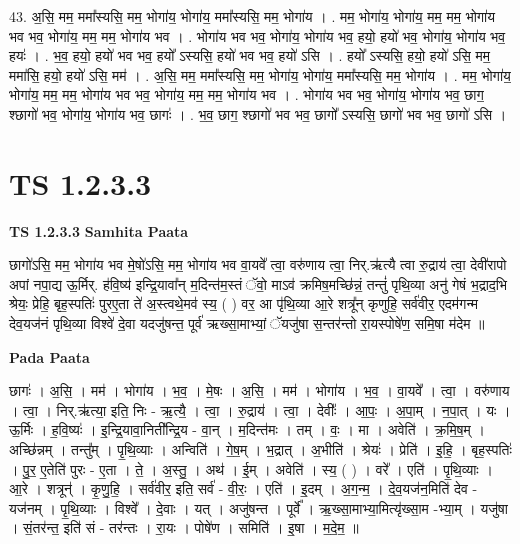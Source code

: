 \documentclass[17pt]{extarticle}
\begin{document}
43. अ॒सि॒ मम॒ ममा᳚स्यसि॒ मम॒ भोगा॑य॒ भोगा॑य॒ ममा᳚स्यसि॒ मम॒ भोगा॑य । . मम॒ भोगा॑य॒ भोगा॑य॒ मम॒ मम॒ भोगा॑य भव भव॒ भोगा॑य॒ मम॒ मम॒ भोगा॑य भव । . भोगा॑य भव भव॒ भोगा॑य॒ भोगा॑य भव॒ हयो॒ हयो॑ भव॒ भोगा॑य॒ भोगा॑य भव॒ हयः॑ । . भ॒व॒ हयो॒ हयो॑ भव भव॒ हयो᳚ ऽस्यसि॒ हयो॑ भव भव॒ हयो॑ ऽसि । . हयो᳚ ऽस्यसि॒ हयो॒ हयो॑ ऽसि॒ मम॒ ममा॑सि॒ हयो॒ हयो॑ ऽसि॒ मम॑ । . अ॒सि॒ मम॒ ममा᳚स्यसि॒ मम॒ भोगा॑य॒ भोगा॑य॒ ममा᳚स्यसि॒ मम॒ भोगा॑य । . मम॒ भोगा॑य॒ भोगा॑य॒ मम॒ मम॒ भोगा॑य भव भव॒ भोगा॑य॒ मम॒ मम॒ भोगा॑य भव । . भोगा॑य भव भव॒ भोगा॑य॒ भोगा॑य भव॒ छाग॒ श्छागो॑ भव॒ भोगा॑य॒ भोगा॑य भव॒ छागः॑ । . भ॒व॒ छाग॒ श्छागो॑ भव भव॒ छागो᳚ ऽस्यसि॒ छागो॑ भव भव॒ छागो॑ ऽसि । \newline
\pagebreak
{}

\section{ TS 1.2.3.3 }

\textbf{TS 1.2.3.3 } \newline
\textbf{Samhita Paata} \newline

छागो॑ऽसि॒ मम॒ भोगा॑य भव मे॒षो॑ऽसि॒ मम॒ भोगा॑य भव वा॒यवे᳚ त्वा॒ वरु॑णाय त्वा॒ निर्.ऋ॑त्यै त्वा रु॒द्राय॑ त्वा॒ देवी॑रापो अपां नपा॒द्य ऊ॒र्मिर्. ह॑वि॒ष्य॑ इन्द्रि॒यावा᳚न् म॒दिन्त॑म॒स्तं ॅवो॒ माऽव॑ क्रमिष॒मच्छि॑न्नं॒ तन्तुं॑ पृथि॒व्या अनु॑ गेषं भ॒द्राद॒भि श्रेयः॒ प्रेहि॒ बृह॒स्पतिः॑ पुरए॒ता ते॑ अ॒स्त्वथे॒मव॑ स्य॒ ( ) वर॒ आ पृ॑थि॒व्या आ॒रे शत्रू᳚न् कृणुहि॒ सर्व॑वीर॒ एदम॑गन्म देव॒यज॑नं पृथि॒व्या विश्वे॑ दे॒वा यदजु॑षन्त॒ पूर्व॑ ऋख्सा॒माभ्यां॒ ॅयजु॑षा स॒न्तर॑न्तो रा॒यस्पोषे॑ण॒ समि॒षा म॑देम ॥ \newline

\textbf{Pada Paata} \newline

छागः॑ । अ॒सि॒ । मम॑ । भोगा॑य । भ॒व॒ । मे॒षः । अ॒सि॒ । मम॑ । भोगा॑य । भ॒व॒ । वा॒यवे᳚ । त्वा॒ । वरु॑णाय । त्वा॒ । निर्.ऋ॑त्या॒ इति॒ निः - ऋ॒त्यै॒ । त्वा॒ । रु॒द्राय॑ । त्वा॒ । देवीः᳚ । आ॒पः॒ । अ॒पा॒म् । न॒पा॒त् । यः । ऊ॒र्मिः । ह॒वि॒ष्यः॑ । इ॒न्द्रि॒यावा॒निती᳚न्द्रि॒य - वा॒न् । म॒दिन्त॑मः । तम् । वः॒ । मा । अवेति॑ । क्र॒मि॒ष॒म् । अच्छि॑न्नम् । तन्तु᳚म् । पृ॒थि॒व्याः । अन्विति॑ । गे॒ष॒म् । भ॒द्रात् । अ॒भीति॑ । श्रेयः॑ । प्रेति॑ । इ॒हि॒ । बृह॒स्पतिः॑ । पु॒र॒ ए॒तेति॑ पुरः - ए॒ता । ते॒ । अ॒स्तु॒ । अथ॑ । ई॒म् । अवेति॑ । स्य॒ ( ) । वरे᳚ । एति॑ । पृ॒थि॒व्याः । आ॒रे । शत्रून्॑ । कृ॒णु॒हि॒ । सर्व॑वीर॒ इति॒ सर्व॑ - वी॒रः॒ । एति॑ । इ॒दम् । अ॒ग॒न्म॒ । दे॒व॒यज॑न॒मिति॑ देव - यज॑नम् । पृ॒थि॒व्याः । विश्वे᳚ । दे॒वाः । यत् । अजु॑षन्त । पूर्वे᳚ । ऋ॒ख्सा॒माभ्या॒मित्यृ॑ख्सा॒म -भ्या॒म् । यजु॑षा । सं॒तर॑न्त॒ इति॑ सं - तर॑न्तः । रा॒यः । पोषे॑ण । समिति॑ । इ॒षा । म॒दे॒म॒ ॥  \newline
\end{document}
